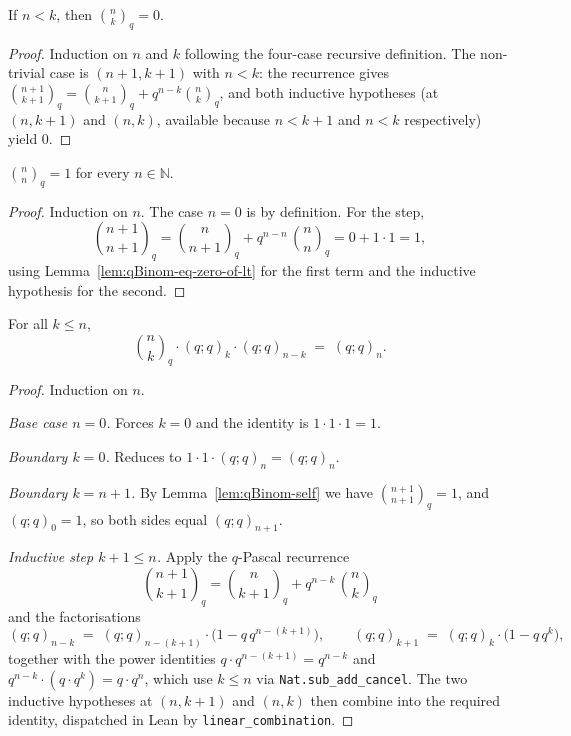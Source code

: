 \begin{lemma}\label{lem:qBinom-eq-zero-of-lt}\leanok{}
If $n < k$, then $\binom{n}{k}_q = 0$.
\end{lemma}

\begin{proof}\leanok
Induction on $n$ and $k$ following the four-case recursive definition.
The non-trivial case is $(n+1, k+1)$ with $n < k$: the recurrence gives
$\binom{n+1}{k+1}_q = \binom{n}{k+1}_q + q^{n-k}\binom{n}{k}_q$, and both
inductive hypotheses (at $(n, k+1)$ and $(n, k)$, available because
$n < k + 1$ and $n < k$ respectively) yield $0$.
\end{proof}

\begin{lemma}[Diagonal]\label{lem:qBinom-self}\leanok{}
$\binom{n}{n}_q = 1$ for every $n \in \mathbb{N}$.
\end{lemma}

\begin{proof}\leanok
Induction on $n$. The case $n = 0$ is by definition. For the step,
\[
  \binom{n+1}{n+1}_q
    = \binom{n}{n+1}_q + q^{n-n}\,\binom{n}{n}_q
    = 0 + 1 \cdot 1 = 1,
\]
using Lemma~\ref{lem:qBinom-eq-zero-of-lt} for the first term and the
inductive hypothesis for the second.
\end{proof}

\begin{lemma}\label{lem:qBinom-closed-form}\leanok{}
For all $k \leq n$,
\[
  \binom{n}{k}_q \cdot (q; q)_k \cdot (q; q)_{n - k} \;=\; (q; q)_n.
\]
\end{lemma}

\begin{proof}\leanok
Induction on $n$.

\emph{Base case $n = 0$.} Forces $k = 0$ and the identity is $1 \cdot 1 \cdot 1 = 1$.

\emph{Boundary $k = 0$.} Reduces to $1 \cdot 1 \cdot (q; q)_n = (q; q)_n$.

\emph{Boundary $k = n + 1$.} By Lemma~\ref{lem:qBinom-self} we have
$\binom{n+1}{n+1}_q = 1$, and $(q; q)_0 = 1$, so both sides equal
$(q; q)_{n+1}$.

\emph{Inductive step $k + 1 \leq n$.} Apply the $q$-Pascal recurrence
\[
  \binom{n+1}{k+1}_q = \binom{n}{k+1}_q + q^{n-k}\,\binom{n}{k}_q
\]
and the factorisations
\[
  (q; q)_{n - k} \;=\; (q; q)_{n - (k+1)} \cdot \bigl(1 - q\,q^{n-(k+1)}\bigr),
  \qquad
  (q; q)_{k + 1} \;=\; (q; q)_k \cdot \bigl(1 - q\,q^k\bigr),
\]
together with the power identities $q \cdot q^{n-(k+1)} = q^{n-k}$ and
$q^{n-k} \cdot (q \cdot q^k) = q \cdot q^n$, which use $k \leq n$ via
\texttt{Nat.sub\_add\_cancel}. The two inductive hypotheses at $(n, k+1)$
and $(n, k)$ then combine into the required identity, dispatched in Lean
by \texttt{linear\_combination}.
\end{proof}

